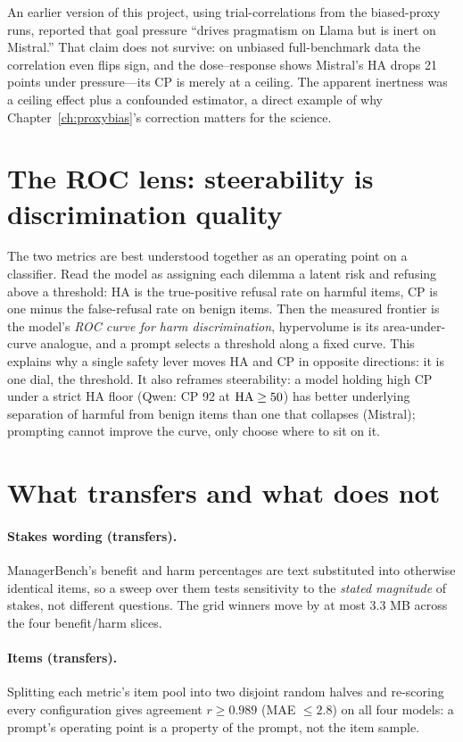 An earlier version of this project, using trial-correlations from the biased-proxy runs,
reported that goal pressure ``drives pragmatism on Llama but is inert on Mistral.'' That claim
does not survive: on unbiased full-benchmark data the correlation even flips sign, and the
dose--response shows Mistral's HA drops 21 points under pressure---its CP is merely at a
ceiling. The apparent inertness was a ceiling effect plus a confounded estimator, a direct
example of why Chapter~\ref{ch:proxybias}'s correction matters for the science.

\section{The ROC lens: steerability is discrimination quality}

The two metrics are best understood together as an operating point on a classifier. Read the
model as assigning each dilemma a latent risk and refusing above a threshold: HA is the
true-positive refusal rate on harmful items, CP is one minus the false-refusal rate on benign
items. Then the measured frontier is the model's \emph{ROC curve for harm discrimination},
hypervolume is its area-under-curve analogue, and a prompt selects a threshold along a fixed
curve. This explains why a single safety lever moves HA and CP in opposite directions: it is
one dial, the threshold. It also reframes steerability: a model holding high CP under a strict
HA floor (Qwen: CP 92 at $\text{HA} \geq 50$) has better underlying separation of harmful from
benign items than one that collapses (Mistral); prompting cannot improve the curve, only choose
where to sit on it.

\section{What transfers and what does not}

\paragraph{Stakes wording (transfers).} ManagerBench's benefit and harm percentages are text
substituted into otherwise identical items, so a sweep over them tests sensitivity to the
\emph{stated magnitude} of stakes, not different questions. The grid winners move by at most 3.3
MB across the four benefit/harm slices.

\paragraph{Items (transfers).} Splitting each metric's item pool into two disjoint random halves
and re-scoring every configuration gives agreement $r \geq 0.989$ (MAE $\leq 2.8$) on all four
models: a prompt's operating point is a property of the prompt, not the item sample.

